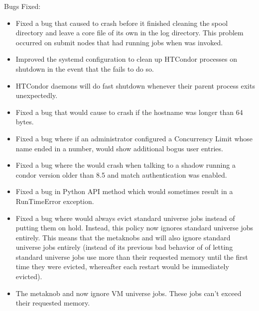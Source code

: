 \noindent Bugs Fixed:

\begin{itemize}

\item Fixed a bug that caused  to crash before it finished
cleaning the spool directory and leave a core file of its own in the log
directory.
This problem occurred on submit nodes that had running jobs when
 was invoked.

\item Improved the systemd configuration to clean up HTCondor processes
on shutdown in the event that the  fails to do so.

\item HTCondor daemons will do fast shutdown whenever their parent process
exits unexpectedly.

\item Fixed a bug that would cause  to crash if the hostname
was longer than 64 bytes.

\item Fixed a bug where if an administrator configured a Concurrency Limit
whose name ended in a number,   would show
additional bogus user entries.

\item Fixed a bug where the  would crash when talking
to a shadow running a condor version older than 8.5 and match authentication
was enabled.

\item Fixed a bug in Python API  method which
would sometimes result in a RunTimeError exception.

\item Fixed a bug where  would always
evict standard universe jobs instead of putting them on hold.  Instead,
this policy now ignores standard universe jobs entirely.  This means
that the metaknobs  and
 will also ignore
standard universe jobs entirely (instead of its previous bad behavior
of of letting standard universe jobs use more than their requested
memory until the first time they were evicted, whereafter each restart
would be immediately evicted).

\item The metaknob  and
 now ignore VM universe
jobs.  These jobs can't exceed their requested memory.


\end{itemize}
